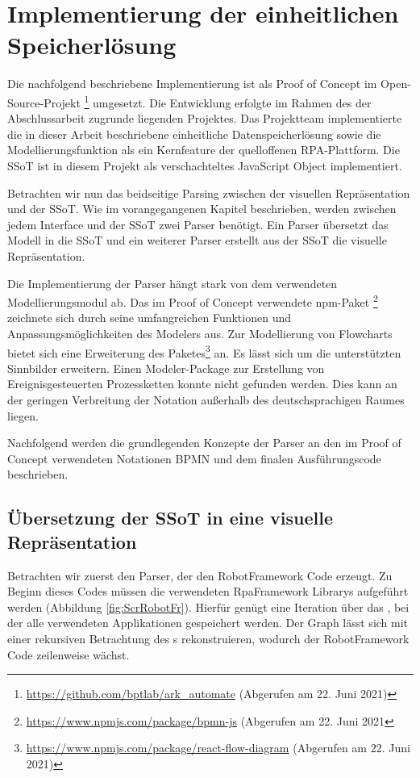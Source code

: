 \section{Implementierung der einheitlichen Speicherlösung}\label{implementierung_ssot}

Die nachfolgend beschriebene Implementierung ist als Proof of Concept im Open-Source-Projekt \footnote{\url{https://github.com/bptlab/ark_automate} (Abgerufen am 22. Juni 2021)}  umgesetzt. Die Entwicklung erfolgte im Rahmen des der Abschlussarbeit zugrunde liegenden Projektes. Das Projektteam implementierte die in dieser Arbeit beschriebene einheitliche Datenspeicherlösung sowie die Modellierungsfunktion als ein Kernfeature der quelloffenen RPA-Plattform. Die SSoT ist in diesem Projekt als verschachteltes JavaScript Object implementiert. 

Betrachten wir nun das beidseitige Parsing zwischen der visuellen Repräsentation und der SSoT. Wie im vorangegangenen Kapitel beschrieben, werden zwischen jedem Interface und der SSoT zwei Parser benötigt. Ein Parser übersetzt das Modell in die SSoT und ein weiterer Parser erstellt aus der SSoT die visuelle Repräsentation.

Die Implementierung der Parser hängt stark von dem verwendeten Modellierungsmodul ab. Das im Proof of Concept verwendete npm-Paket \footnote{\url{https://www.npmjs.com/package/bpmn-js} (Abgerufen am 22. Juni 2021} zeichnete sich durch seine umfangreichen Funktionen und Anpassungsmöglichkeiten des Modelers aus. Zur Modellierung von Flowcharts bietet sich eine Erweiterung des  Paketes\footnote{\url{https://www.npmjs.com/package/react-flow-diagram} (Abgerufen am 22. Juni 2021)} an. Es lässt sich um die unterstützten Sinnbilder erweitern. Einen Modeler-Package zur Erstellung von Ereignisgesteuerten Prozessketten konnte nicht gefunden werden. Dies kann an der geringen Verbreitung der Notation außerhalb des deutschsprachigen Raumes liegen.

Nachfolgend werden die grundlegenden Konzepte der Parser an den im Proof of Concept verwendeten Notationen BPMN und dem finalen Ausführungscode beschrieben.

\subsection{Übersetzung der SSoT in eine visuelle Repräsentation}

Betrachten wir zuerst den Parser, der den RobotFramework Code erzeugt. Zu Beginn dieses Codes müssen die verwendeten RpaFramework Librarys aufgeführt werden (Abbildung \ref{fig:ScrRobotFr}). Hierfür genügt eine Iteration über das , bei der alle verwendeten Applikationen gespeichert werden. Der Graph lässt sich mit einer rekursiven Betrachtung des s rekonstruieren, wodurch der RobotFramework Code zeilenweise wächst. 

